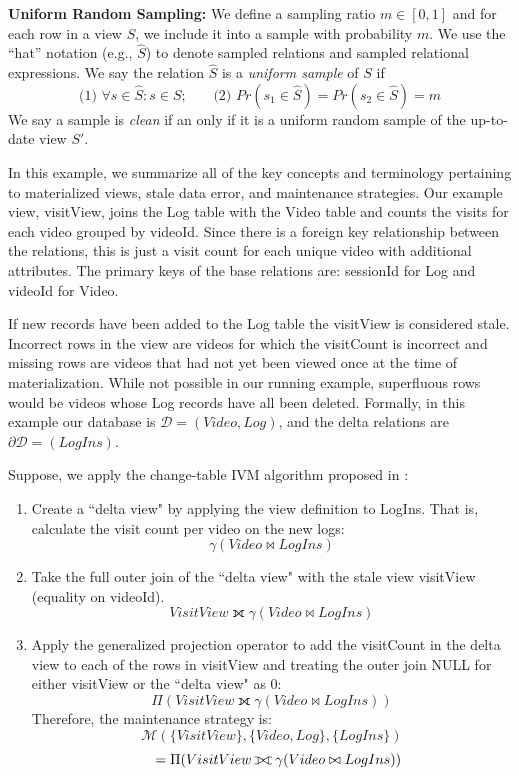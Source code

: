 \vspace{0.45em}
\fi

\noindent \textbf{Uniform Random Sampling: }
We define a sampling ratio $m\in [0,1]$ and for each row in a view $S$, we include it into a sample with probability $m$.
We use the ``hat'' notation (e.g., $\widehat{S}$) to denote sampled relations and sampled relational expressions.
We say the relation $\widehat{S}$ is a \emph{uniform sample} of $S$ if
\[\text{(1) } \forall s \in \widehat{S} : s \in S\text{;~~~~~ (2) }Pr(s_1 \in \widehat{S}) =  Pr(s_2 \in \widehat{S}) = m\]
We say a sample is \emph{clean} if an only if it is a uniform random sample of the up-to-date view $S'$. 

\vspace{0.25em}

\begin{example}\label{concepts}
In this example, we summarize all of the key concepts and terminology pertaining to materialized views, stale data error, and maintenance strategies.
Our example view, visitView, joins the Log table with the Video table and counts the visits for each video grouped by videoId.
Since there is a foreign key relationship between the relations, this is just a visit count for each unique video with additional attributes. 
The primary keys of the base relations are: sessionId for Log and videoId for Video.

If new records have been added to the Log table the visitView is considered stale.
Incorrect rows in the view are videos for which the visitCount is incorrect and missing rows are videos that had not yet been viewed once at the time of materialization. 
While not possible in our running example, superfluous rows would be videos whose Log records have all been deleted.
Formally, in this example our database is $\mathcal{D}=(Video, Log)$, and the delta relations are $\partial\mathcal{D}=(LogIns)$. 

Suppose, we apply the change-table IVM algorithm proposed in \cite{gupta1995maintenance}:
\vspace{-.55em}
\begin{enumerate}[noitemsep]
\item Create a ``delta view" by applying the view definition to LogIns. That is, calculate the visit count per video on the new logs:
\[
 \gamma(Video \bowtie LogIns)
\]
\item Take the full outer join of the ``delta view" with the stale view visitView (equality on videoId).
\[
 VisitView \fullouterjoin \gamma(Video \bowtie LogIns)
\]
\item Apply the generalized projection operator to add the visitCount in the delta view to each of the rows in visitView and treating the outer join NULL for either visitView or the ``delta view" as 0: 
\[
 \Pi (VisitView \fullouterjoin \gamma(Video \bowtie LogIns))
\]
Therefore, the maintenance strategy is:
\[
 \mathcal{M}(\{VisitView\},\{Video, Log\}, \{LogIns\})
\]
\[
\text{\hspace{0.7em}} = \Pi (VisitView \fullouterjoin \gamma(Video \bowtie LogIns))
\]
\end{enumerate}

\end{example}

